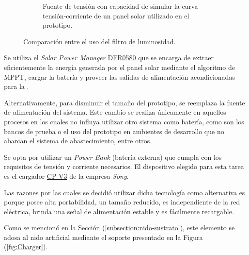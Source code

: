 \begin{figure}[H]
\begin{subfigure}{0.3\textwidth}
        	\caption{Fuente de tensión con capacidad de simular la curva tensión-corriente de un panel solar utilizado en el prototipo.}
			\label{fig:fuente_prototipo}
        \end{subfigure}
	\caption{Comparación entre el uso del filtro de luminosidad.}
	\label{fig:elementos_prototipo}
\end{figure}

Se utiliza el \textit{Solar Power Manager} \href{https://wiki.dfrobot.com/Solar_Power_Manager_For_12V_Lead-Acid_Battery_SKU__DFR0580}{DFR0580} que se encarga de extraer eficientemente la energía generada por el panel solar mediante el algoritmo de MPPT, cargar la batería y proveer las salidas de alimentación acondicionadas para la \rpi.

Alternativamente, para disminuir el tamaño del prototipo, se reemplaza la fuente de alimentación del sistema. Este cambio se realiza únicamente en aquellos procesos en los cuales no influya utilizar otro sistema como batería, como son los bancos de prueba o el uso del prototipo en ambientes de desarrollo que no abarcan el sistema de abastecimiento, entre otros.

Se opta por utilizar un \textit{Power Bank} (batería externa) que cumpla con los requisitos de tensión y corriente necesarios. El dispositivo elegido para esta tarea es el cargador \href{https://www.sony.com/electronics/support/res/manuals/W000/W0002536M.pdf}{CP-V3} de la empresa \textit{Sony}.

Las razones por las cuales se decidió utilizar dicha tecnología como alternativa es porque posee alta portabilidad, un tamaño reducido, es independiente de la red eléctrica, brinda una señal de alimentación estable y es fácilmente recargable. 

Como se mencionó en la Sección (\ref{subsection:nido-sustrato}), este elemento se adosa al nido artificial mediante el soporte presentado en la Figura (\ref{fig:Charger}). 

